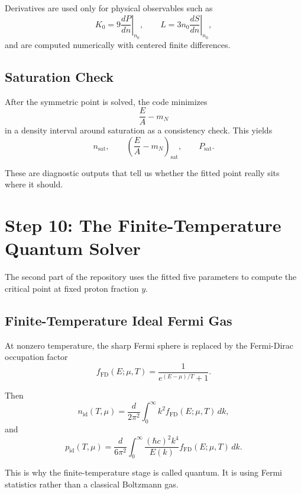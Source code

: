 \documentclass[11pt]{article}
\begin{document}
Derivatives are used only for physical observables such as
\begin{equation}
K_0=9\left.\frac{dP}{dn}\right|_{n_0},
\qquad
L=3n_0\left.\frac{dS}{dn}\right|_{n_0},
\end{equation}
and are computed numerically with centered finite differences.

\subsection{Saturation Check}

After the symmetric point is solved, the code minimizes
\[
\frac{E}{A}-m_N
\]
in a density interval around saturation as a consistency check. This yields
\[
n_{\mathrm{sat}},\qquad
\left(\frac{E}{A}-m_N\right)_{\mathrm{sat}},\qquad
P_{\mathrm{sat}}.
\]

These are diagnostic outputs that tell us whether the fitted point really sits
where it should.

\section{Step 10: The Finite-Temperature Quantum Solver}

The second part of the repository uses the fitted five parameters to compute
the critical point at fixed proton fraction $y$.

\subsection{Finite-Temperature Ideal Fermi Gas}

At nonzero temperature, the sharp Fermi sphere is replaced by the Fermi-Dirac
occupation factor
\begin{equation}
f_{\mathrm{FD}}(E;\mu,T)=\frac{1}{e^{(E-\mu)/T}+1}.
\end{equation}

Then
\begin{equation}
n_{\mathrm{id}}(T,\mu)
=
\frac{d}{2\pi^2}\int_0^\infty k^2 f_{\mathrm{FD}}(E;\mu,T)\,dk,
\end{equation}
and
\begin{equation}
p_{\mathrm{id}}(T,\mu)
=
\frac{d}{6\pi^2}\int_0^\infty
\frac{(\hbar c)^2k^4}{E(k)}f_{\mathrm{FD}}(E;\mu,T)\,dk.
\end{equation}

This is why the finite-temperature stage is called quantum. It is using Fermi
statistics rather than a classical Boltzmann gas.
\end{document}
